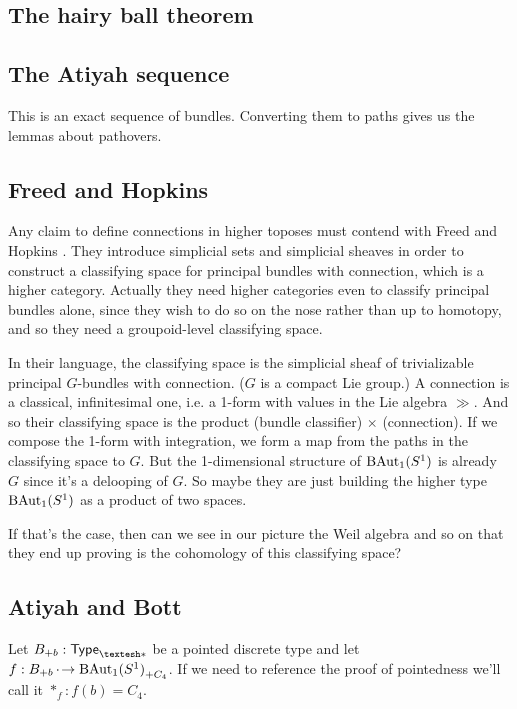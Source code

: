 \documentclass[12pt]{article}
\begin{document}
\subsection{The hairy ball theorem}

\subsection{The Atiyah sequence}

This is an exact sequence of bundles. Converting them to paths gives us the lemmas about pathovers.

\subsection{Freed and Hopkins}
Any claim to define connections in higher toposes must contend with Freed and Hopkins \cite{freed2013chernweil}. They introduce simplicial sets and simplicial sheaves in order to construct a classifying space for principal bundles with connection, which is a higher category. Actually they need higher categories even to classify principal bundles alone, since they wish to do so on the nose rather than up to homotopy, and so they need a groupoid-level classifying space.

In their language, the classifying space is the simplicial sheaf of trivializable principal \( G \)-bundles with connection. (\( G \) is a compact Lie group.) A connection is a classical, infinitesimal one, i.e. a 1-form with values in the Lie algebra \( \gg \). And so their classifying space is the product (bundle classifier) \( \times \) (connection). If we compose the 1-form with integration, we form a map from the paths in the classifying space to \( G \). But the 1-dimensional structure of \( \mathrm{BAut}_1(S^1) \) is already \( G \) since it's a delooping of \( G \). So maybe they are just building the higher type \( \mathrm{BAut}_1(S^1) \) as a product of two spaces.

If that's the case, then can we see in our picture the Weil algebra and so on that they end up proving is the cohomology of this classifying space?

\subsection{Atiyah and Bott}

Let \( \Bpb:\Typesp \) be a pointed discrete type and let \( f:{B}_{+{b}}\,\cdot\!\to{\mathrm{BAut}_1(S^1)}_{+{C_4}} \). If we need to reference the proof of pointedness we'll call it \( *_f:f(b)=C_4 \). 
\end{document}

